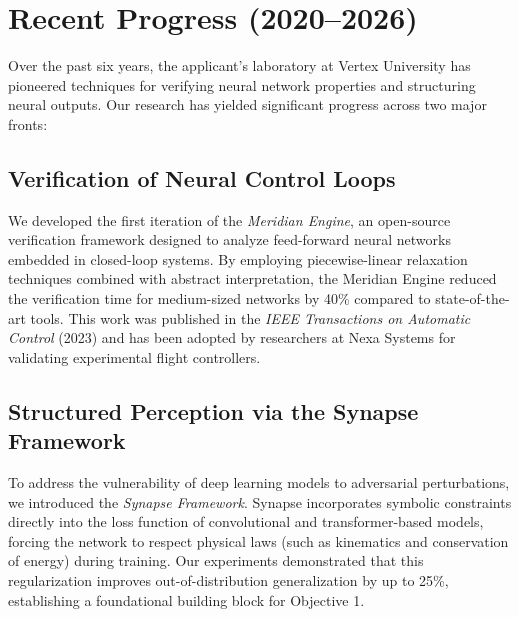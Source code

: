 \section{Recent Progress (2020--2026)}
Over the past six years, the applicant's laboratory at Vertex University has pioneered techniques for verifying neural network properties and structuring neural outputs. Our research has yielded significant progress across two major fronts:

\subsection{Verification of Neural Control Loops}
We developed the first iteration of the \emph{Meridian Engine}, an open-source verification framework designed to analyze feed-forward neural networks embedded in closed-loop systems. By employing piecewise-linear relaxation techniques combined with abstract interpretation, the Meridian Engine reduced the verification time for medium-sized networks by 40\% compared to state-of-the-art tools. This work was published in the \emph{IEEE Transactions on Automatic Control} (2023) and has been adopted by researchers at Nexa Systems for validating experimental flight controllers.

\subsection{Structured Perception via the Synapse Framework}
To address the vulnerability of deep learning models to adversarial perturbations, we introduced the \emph{Synapse Framework}. Synapse incorporates symbolic constraints directly into the loss function of convolutional and transformer-based models, forcing the network to respect physical laws (such as kinematics and conservation of energy) during training. Our experiments demonstrated that this regularization improves out-of-distribution generalization by up to 25\%, establishing a foundational building block for Objective 1.

